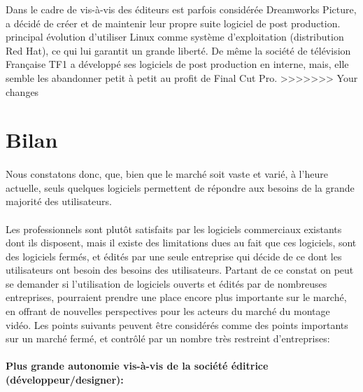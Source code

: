 \begin{itemize}
Dans le cadre de %
vis-à-vis des éditeurs est parfois considérée %
Dreamworks Picture, a décidé de créer et de maintenir leur propre
suite logiciel \cite {Dreamworks} de post production. %
principal %
évolution %
d'utiliser Linux comme système d'exploitation (distribution Red Hat),
ce qui lui garantit un grande liberté. De même la société
de télévision Française TF1 a développé ses logiciels de post
production en interne, mais, elle semble les abandonner petit à petit
au profit de Final Cut Pro.
>>>>>>> Your changes

\newpage

\section {Bilan}

\paragraph { }

Nous constatons donc, que, bien que le marché soit vaste et varié,
à l'heure actuelle, seuls quelques logiciels permettent de répondre
aux besoins de la grande majorité des utilisateurs.

\paragraph{}

Les professionnels sont plutôt satisfaits par les logiciels commerciaux
existants dont ils disposent, mais il existe des limitations dues au
fait que ces logiciels, sont des logiciels fermés, et édités par une
seule entreprise qui décide de ce dont les utilisateurs ont besoin des
besoins des utilisateurs. Partant de ce constat on peut se demander
si l'utilisation de logiciels ouverts et édités par de nombreuses
entreprises, pourraient prendre une place encore plus importante sur le
marché, en offrant de nouvelles perspectives pour les acteurs du marché
du montage vidéo. Les points suivants peuvent être considérés comme
des points importants sur un marché fermé, et contrôlé par un nombre
très restreint d'entreprises:

\paragraph{Plus grande autonomie vis-à-vis de la société éditrice
(développeur/designer):}


\end{itemize}
